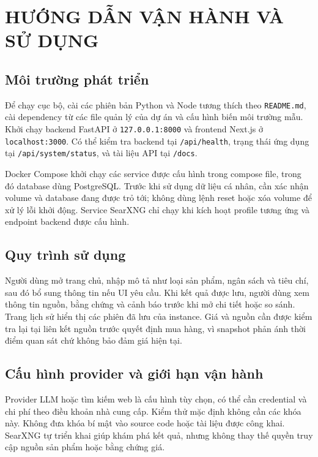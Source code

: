 \chapter{HƯỚNG DẪN VẬN HÀNH VÀ SỬ DỤNG}

\section{Môi trường phát triển}

Để chạy cục bộ, cài các phiên bản Python và Node tương thích theo \texttt{README.md}, cài dependency từ các file quản lý của dự án và cấu hình biến môi trường mẫu. Khởi chạy backend FastAPI ở \texttt{127.0.0.1:8000} và frontend Next.js ở \texttt{localhost:3000}. Có thể kiểm tra backend tại \texttt{/api/health}, trạng thái ứng dụng tại \texttt{/api/system/status}, và tài liệu API tại \texttt{/docs}.

Docker Compose khởi chạy các service được cấu hình trong compose file, trong đó database dùng PostgreSQL. Trước khi sử dụng dữ liệu cá nhân, cần xác nhận volume và database đang được trỏ tới; không dùng lệnh reset hoặc xóa volume để xử lý lỗi khởi động. Service SearXNG chỉ chạy khi kích hoạt profile tương ứng và endpoint backend được cấu hình.

\section{Quy trình sử dụng}

Người dùng mở trang chủ, nhập mô tả như loại sản phẩm, ngân sách và tiêu chí, sau đó bổ sung thông tin nếu UI yêu cầu. Khi kết quả được lưu, người dùng xem thông tin nguồn, bằng chứng và cảnh báo trước khi mở chi tiết hoặc so sánh. Trang lịch sử hiển thị các phiên đã lưu của instance. Giá và nguồn cần được kiểm tra lại tại liên kết nguồn trước quyết định mua hàng, vì snapshot phản ánh thời điểm quan sát chứ không bảo đảm giá hiện tại.

\section{Cấu hình provider và giới hạn vận hành}

Provider LLM hoặc tìm kiếm web là cấu hình tùy chọn, có thể cần credential và chi phí theo điều khoản nhà cung cấp. Kiểm thử mặc định không cần các khóa này. Không đưa khóa bí mật vào source code hoặc tài liệu được công khai. SearXNG tự triển khai giúp khám phá kết quả, nhưng không thay thế quyền truy cập nguồn sản phẩm hoặc bằng chứng giá.

